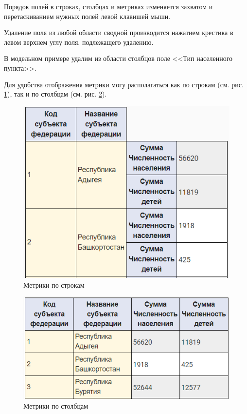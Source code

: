 \documentclass[../user-manual.tex]{subfiles}
\begin{document}
	Порядок полей в строках, столбцах и метриках изменяется захватом и перетаскиванием нужных полей левой клавишей мыши.
	
	Удаление поля из любой области сводной производится нажатием крестика в левом верхнем углу поля, подлежащего удалению.
	
	\begin{modelExample}
		В модельном примере удалим из области столбцов поле <<Тип населенного пункта>>.
	\end{modelExample}
	
	
	Для удобства отображения метрики могу располагаться как по строкам (см. рис. \ref{fig:metrics-on-string}), так и по столбцам (см. рис. \ref{fig:metrics-on-column}). 
	
	\begin{figure}[h]
		\centering
		\includegraphics[width=\graphicswidth]{img/5-metrics-on-string.png}
		\caption{Метрики по строкам}
		\label{fig:metrics-on-string}
	\end{figure}

	\begin{figure}[h]
		\centering
		\includegraphics[width=\graphicswidth]{img/6-metrics-on-column.png}
		\caption{Метрики по столбцам}
		\label{fig:metrics-on-column}
	\end{figure}
\end{document}
